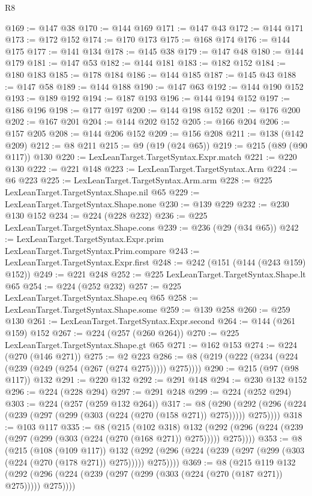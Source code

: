 \begin{lexlean}{R8}
\begin{coremodule}
{{{{{{{{{{{{{{{{{{{{{{{{{{{{{{{{{{{{{{{{@169 := @147 @38
@170 := @144 @169
@171 := @147 @43
@172 := @144 @171
@173 := @172 @152
@174 := @170 @173
@175 := @168 @174
@176 := @144 @175
@177 := @141 @134
@178 := @145 @38
@179 := @147 @48
@180 := @144 @179
@181 := @147 @53
@182 := @144 @181
@183 := @182 @152
@184 := @180 @183
@185 := @178 @184
@186 := @144 @185
@187 := @145 @43
@188 := @147 @58
@189 := @144 @188
@190 := @147 @63
@192 := @144 @190 @152
@193 := @189 @192
@194 := @187 @193
@196 := @144 @194 @152
@197 := @186 @196
@198 := @177 @197
@200 := @144 @198 @152
@201 := @176 @200
@202 := @167 @201
@204 := @144 @202 @152
@205 := @166 @204
@206 := @157 @205
@208 := @144 @206 @152
@209 := @156 @208
@211 := @138 (@142 @209)
@212 := @8 @211
@215 := @9 (@19 (@24 @65))
@219 := @215 (@89 (@90 @117)) @130
@220 := LexLeanTarget.TargetSyntax.Expr.match
@221 := @220 @130
@222 := @221 @148
@223 := LexLeanTarget.TargetSyntax.Arm
@224 := @6 @223
@225 := LexLeanTarget.TargetSyntax.Arm.arm
@228 := @225 LexLeanTarget.TargetSyntax.Shape.nil @65
@229 := LexLeanTarget.TargetSyntax.Shape.none
@230 := @139 @229
@232 := @230 @130 @152
@234 := @224 (@228 @232)
@236 := @225 LexLeanTarget.TargetSyntax.Shape.cons
@239 := @236 (@29 (@34 @65))
@242 := LexLeanTarget.TargetSyntax.Expr.prim LexLeanTarget.TargetSyntax.Prim.compare
@243 := LexLeanTarget.TargetSyntax.Expr.first
@248 := @242 (@151 (@144 (@243 @159) @152))
@249 := @221 @248
@252 := @225 LexLeanTarget.TargetSyntax.Shape.lt @65
@254 := @224 (@252 @232)
@257 := @225 LexLeanTarget.TargetSyntax.Shape.eq @65
@258 := LexLeanTarget.TargetSyntax.Shape.some
@259 := @139 @258
@260 := @259 @130
@261 := LexLeanTarget.TargetSyntax.Expr.second
@264 := @144 (@261 @159) @152
@267 := @224 (@257 (@260 @264))
@270 := @225 LexLeanTarget.TargetSyntax.Shape.gt @65
@271 := @162 @153
@274 := @224 (@270 (@146 @271))
@275 := @2 @223
@286 := @8 (@219 (@222 (@234 (@224 (@239 (@249 (@254 (@267 (@274 @275))))) @275))))
@290 := @215 (@97 (@98 @117)) @132
@291 := @220 @132
@292 := @291 @148
@294 := @230 @132 @152
@296 := @224 (@228 @294)
@297 := @291 @248
@299 := @224 (@252 @294)
@303 := @224 (@257 (@259 @132 @264))
@317 := @8
    (@290 (@292 (@296 (@224 (@239 (@297 (@299 (@303 (@224 (@270 (@158 @271)) @275))))) @275))))
@318 := @103 @117
@335 := @8
    (@215
      (@102 @318)
      @132
      (@292 (@296 (@224 (@239 (@297 (@299 (@303 (@224 (@270 (@168 @271)) @275))))) @275))))
@353 := @8
    (@215
      (@108 (@109 @117))
      @132
      (@292 (@296 (@224 (@239 (@297 (@299 (@303 (@224 (@270 (@178 @271)) @275))))) @275))))
@369 := @8
    (@215
      @119
      @132
      (@292 (@296 (@224 (@239 (@297 (@299 (@303 (@224 (@270 (@187 @271)) @275))))) @275))))
}}}}}}}}}}}}}}}}}}}}}}}}}}}}}}}}}}}}}}}}
\end{coremodule}
\end{lexlean}

